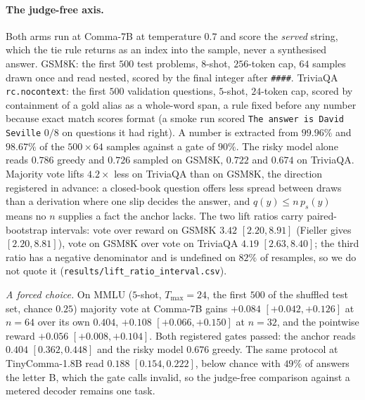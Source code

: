\paragraph{The judge-free axis.}\label{app:judgefree}
Both arms run at Comma-7B at temperature $0.7$ and score the \emph{served} string, which the tie rule
returns as an index into the sample, never a synthesised answer. GSM8K: the first $500$ test problems,
$8$-shot, $256$-token cap, $64$ samples drawn once and read nested, scored by the final integer after
\texttt{\#\#\#\#}. TriviaQA \texttt{rc.nocontext}: the first $500$ validation questions, $5$-shot,
$24$-token cap, scored by containment of a gold alias as a whole-word span, a rule fixed before any number
because exact match scores format (a smoke run scored \texttt{The answer is David Seville} $0/8$ on
questions it had right). A number is extracted from $99.96\%$ and $98.67\%$ of the $500 \times 64$ samples
against a gate of $90\%$. The risky model alone reads $0.786$ greedy and $0.726$ sampled on GSM8K, $0.722$
and $0.674$ on TriviaQA. Majority vote lifts $4.2\times$ less on TriviaQA than on GSM8K, the direction
registered in advance: a closed-book question offers less spread between draws than a derivation where one
slip decides the answer, and $q(y) \le n\,p_s(y)$ means no $n$ supplies a fact the anchor lacks. The two
lift ratios carry paired-bootstrap intervals: vote over reward on GSM8K $3.42$ $[2.20, 8.91]$ (Fieller
gives $[2.20, 8.81]$), vote on GSM8K over vote on TriviaQA $4.19$ $[2.63, 8.40]$; the third ratio has a
negative denominator and is undefined on $82\%$ of resamples, so we do not quote it
(\texttt{results/\allowbreak lift\_\allowbreak ratio\_\allowbreak interval.csv}).

\emph{A forced choice.} On MMLU ($5$-shot, $T_{\max}=24$, the first $500$ of the shuffled test set,
chance $0.25$) majority vote at Comma-7B gains $+0.084$ $[+0.042, +0.126]$ at $n=64$ over its own $0.404$,
$+0.108$ $[+0.066, +0.150]$ at $n=32$, and the pointwise reward $+0.056$ $[+0.008, +0.104]$. Both registered
gates passed: the anchor reads $0.404$ $[0.362, 0.448]$ and the risky model $0.676$ greedy. The same
protocol at TinyComma-1.8B read $0.188$ $[0.154, 0.222]$, below chance with $49\%$ of answers the letter
B, which the gate calls invalid, so the judge-free comparison against a metered decoder remains one task.

